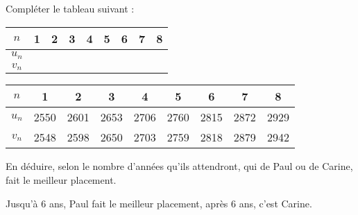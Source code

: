 \begin{questions}
	
	\question[1] Compléter le tableau suivant :
	
	\begin{center}
		
		\begin{tabular}{|@{$\quad $}c@{$\quad $}| @{$\qquad $}c@{$\qquad $} | @{$\qquad $}c@{$\qquad $} | @{$\qquad $}c@{$\qquad $} | @{$\qquad $}c@{$\qquad $} |@{$\qquad $}c@{$\qquad $} |@{$\qquad $}c@{$\qquad $} |@{$\qquad $}c@{$\qquad $}|@{$\qquad $}c@{$\qquad $}|}
			\hline
			$n$                           & 1 & 2 & 3 & 4 & 5 & 6 & 7 & 8 \\ \hline
			$u_n$ &   &   &   &   &   &   &   &   \\ \hline
			$v_n$ &   &   &   &   &   &   &   &   \\ \hline
		\end{tabular}
	\end{center}

	\begin{solution}
		\begin{small}
			
		\begin{center}
			
			\begin{tabular}{|@{$\quad $}c@{$\quad $}| @{\ }c@{\ } | @{\ }c@{\ } | @{\ }c@{\ } | @{\ }c@{\ } |@{\ }c@{\ } |@{\ }c@{\ } |@{\ }c@{\ }|@{\ }c@{\ }|}
				\hline
				$n$                           & 1 & 2 & 3 & 4 & 5 & 6 & 7 & 8 \\ \hline
				$u_n$ & 2550  & 2601  & 2653  & 2706  & 2760  & 2815  & 2872  & 2929  \\ \hline
				$v_n$ &  2548 &  2598 &  2650 &  2703 &  2759 &  2818 &  2879 &  2942 \\ \hline
			\end{tabular}
		\end{center}
		\end{small}
	\end{solution}
	
	\question[1] En déduire, selon le nombre d'années qu'ils attendront, qui de Paul ou de Carine, fait le meilleur placement.
	\begin{solution}
		Jusqu'à 6 ans, Paul fait le meilleur placement, après 6 ans, c'est Carine.
	\end{solution}
	
\end{questions}